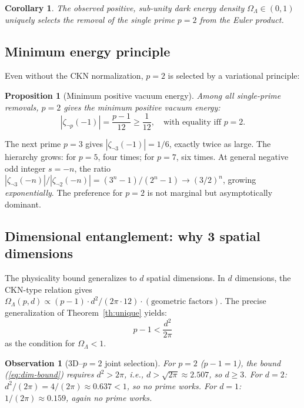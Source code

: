 \documentclass[11pt,a4paper]{article}
\newtheorem{proposition}{Proposition}
\newtheorem{observation}{Observation}
\newtheorem{corollary}{Corollary}
\begin{document}
\begin{corollary}
The observed positive, sub-unity dark energy density
$\Omega_\Lambda \in (0, 1)$ uniquely selects the removal of the
single prime $p = 2$ from the Euler product.
\end{corollary}

\subsection{Minimum energy principle}

Even without the CKN normalization, $p = 2$ is selected by a
variational principle:

\begin{proposition}[Minimum positive vacuum energy]
Among all single-prime removals, $p = 2$ gives the minimum
positive vacuum energy:
\begin{equation}
|\zeta_{\neg p}(-1)| = \frac{p-1}{12} \geq \frac{1}{12},
\quad \text{with equality iff } p = 2.
\end{equation}
\end{proposition}

The next prime $p = 3$ gives $|\zeta_{\neg 3}(-1)| = 1/6$, exactly
twice as large. The hierarchy grows: for $p = 5$, four times; for
$p = 7$, six times. At general negative odd integer $s = -n$, the
ratio $|\zeta_{\neg 3}(-n)|/|\zeta_{\neg 2}(-n)| = (3^n - 1)/(2^n - 1)
\to (3/2)^n$, growing \emph{exponentially}. The preference for
$p = 2$ is not marginal but asymptotically dominant.

\subsection{Dimensional entanglement: why 3 spatial dimensions}

The physicality bound generalizes to $d$ spatial dimensions. In
$d$ dimensions, the CKN-type relation gives $\Omega_\Lambda(p, d)
\propto (p-1) \cdot d^2/(2\pi \cdot 12) \cdot (\text{geometric factors})$.
The precise generalization of
Theorem~\ref{th:unique} yields:
\begin{equation}\label{eq:dim-bound}
p - 1 < \frac{d^2}{2\pi}
\end{equation}
as the condition for $\Omega_\Lambda < 1$.

\begin{observation}[3D--$p{=}2$ joint selection]
For $p = 2$ ($p - 1 = 1$), the bound (\ref{eq:dim-bound}) requires
$d^2 > 2\pi$, i.e., $d > \sqrt{2\pi} \approx 2.507$, so
$d \geq 3$. For $d = 2$: $d^2/(2\pi) = 4/(2\pi) \approx 0.637 < 1$,
so \emph{no prime works}. For $d = 1$: $1/(2\pi) \approx 0.159$,
again no prime works.
\end{observation}
\end{document}
